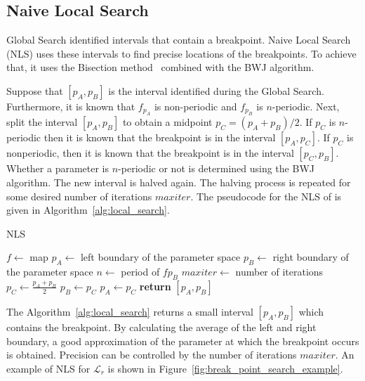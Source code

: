 \subsection{Naive Local Search}
\label{subsec:naive_local_search}

Global Search identified intervals that contain a breakpoint.
Naive Local Search (NLS) uses these intervals to find precise locations of the breakpoints.
To achieve that, it uses the Bisection method~\cite{Burden2015-lp} combined with the BWJ algorithm.
\par
Suppose that $[p_{A}, p_{B}]$ is the interval identified during the Global Search.
Furthermore, it is known that $f_{p_{A}}$ is non-periodic and $f_{p_{B}}$ is $n$-periodic.
Next, split the interval $[p_{A}, p_{B}]$ to obtain a midpoint $p_{C} = (p_{A}+p_{B})/2$.
If $p_{C}$ is $n$-periodic then it is known that the breakpoint is in the interval $[p_{A}, p_{C}]$.
If $p_{C}$ is nonperiodic, then it is known that the breakpoint is in the interval $[p_{C}, p_{B}]$.
Whether a parameter is $n$-periodic or not is determined using the BWJ algorithm.
The new interval is halved again.
The halving process is repeated for some desired number of iterations $maxiter$.
The pseudocode for the NLS of is given in Algorithm~\ref{alg:local_search}.

\begin{algorithm}[!h]
    \caption{NLS}
    \label{alg:local_search}
    \begin{algorithmic}[1]
        \Statex $f \gets$ map
        \Statex $p_{A} \gets$ left boundary of the parameter space
        \Statex $p_{B} \gets$ right boundary of the parameter space
        \Statex $n \gets$ period of $f{p_{B}}$
        \Statex $maxiter \gets$ number of iterations
            \State $p_{C} \gets \frac{p_{A}+p_{B}}{2}$
                \State $p_{B} \gets p_{C}$
            \Else
                \State $p_{A} \gets p_{C}$
            \EndIf
        \EndFor
        \State \textbf{return} $[p_{A}, p_{B}]$
    \end{algorithmic}
\end{algorithm}

\par
The Algorithm~\ref{alg:local_search} returns a small interval $[p_{A}, p_{B}]$ which contains the breakpoint.
By calculating the average of the left and right boundary, a good approximation of the parameter at which the breakpoint occurs is obtained.
Precision can be controlled by the number of iterations $maxiter$.
An example of NLS for $\mathcal{L}_{r}$ is shown in Figure~\ref{fig:break_point_search_example}.

